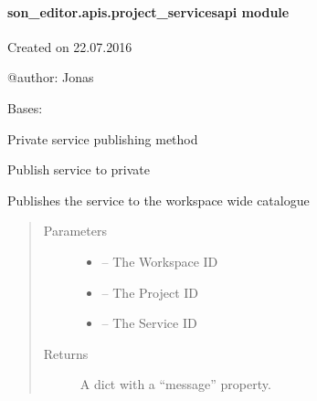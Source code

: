\documentclass[letterpaper,10pt,english]{sphinxmanual}
\begin{document}
\paragraph{son\_editor.apis.project\_servicesapi module}
\label{_source/son_editor.apis:module-son_editor.apis.project_servicesapi}\label{_source/son_editor.apis:son-editor-apis-project-servicesapi-module}
Created on 22.07.2016

@author: Jonas

\begin{fulllineitems}
\label{_source/son_editor.apis:son_editor.apis.project_servicesapi.PrivateService}
Bases: 

Private service publishing method

\begin{fulllineitems}
\label{_source/son_editor.apis:son_editor.apis.project_servicesapi.PrivateService.get}
Publish service to private

Publishes the service to the workspace wide catalogue
\begin{quote}\begin{description}
\item[{Parameters}] \leavevmode\begin{itemize}
\item {} 
 -- The Workspace ID

\item {} 
 -- The Project ID

\item {} 
 -- The Service ID

\end{itemize}

\item[{Returns}] \leavevmode
A dict with a ``message'' property.

\end{description}\end{quote}

\end{fulllineitems}


\begin{fulllineitems}
\label{_source/son_editor.apis:son_editor.apis.project_servicesapi.PrivateService.methods}
\end{fulllineitems}


\end{fulllineitems}
\end{document}
